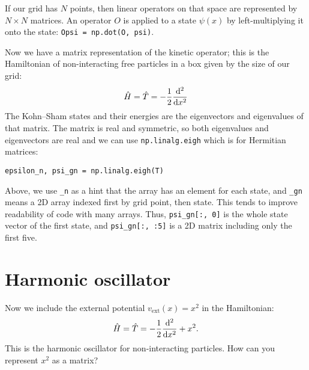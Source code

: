 \documentclass{article}
\begin{document}
If our grid has $N$ points, then linear operators on that
space are represented by $N\times N$ matrices.  An operator $O$ is
applied to a state $\psi(x)$ by left-multiplying it onto the state:
\texttt{Opsi = np.dot(O, psi)}.


\noindent Now we have a matrix representation of the kinetic operator; this
is the Hamiltonian of non-interacting free particles in a box given by
the size of our grid:
\begin{align}
  \hat H = \hat T = -\frac12 \frac{\mathrm d ^2}{\mathrm d x^2}
\end{align}
The Kohn--Sham states and their energies are the eigenvectors and
eigenvalues of that matrix.  The matrix is real and symmetric, so both eigenvalues and eigenvectors are real and we can use
\texttt{np.linalg.eigh} which is for Hermitian matrices:
\begin{lstlisting}
epsilon_n, psi_gn = np.linalg.eigh(T)
\end{lstlisting}
Above, we use \lstinline{_n} as a hint that the array has an element for each
state,
and \lstinline{_gn} means a 2D array indexed first by grid point, then state.
This tends to improve readability of code with many arrays.
Thus, \lstinline{psi_gn[:, 0]} is the whole state vector of the first state,
and \lstinline{psi_gn[:, :5]} is a 2D matrix including only the first five.


\section*{Harmonic oscillator}
Now we include the external potential $v_{\mathrm{ext}}(x) = x^2$ in the Hamiltonian:
\begin{align}
  \hat H = \hat T = -\frac12 \frac{\mathrm d ^2}{\mathrm d x^2} + x^2.
\end{align}
This is the harmonic oscillator for non-interacting particles.
How can you represent $x^2$ as a matrix?
\end{document}
